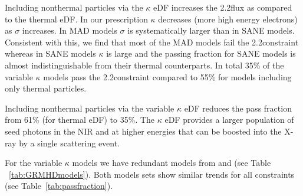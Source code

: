 Including nonthermal particles via the $\kappa$ eDF increases the 2.2\um flux as compared to the thermal eDF.  In our prescription $\kappa$ decreases (more high energy electrons) as $\sigma$ increases.  In MAD models $\sigma$ is systematically larger than in SANE models.  Consistent with this, we find that most of the MAD models fail the 2.2\um constraint whereas in SANE models $\kappa$ is large and the passing fraction for SANE models is almost indistinguishable from their thermal counterparts.
In total 35\% of the variable $\kappa$ models pass the 2.2\um constraint compared to 55\% for models including only thermal particles.


Including nonthermal particles via the variable $\kappa$ eDF reduces the pass fraction from 61\% (for thermal eDF) to 35\%.  The $\kappa$ eDF provides a larger population of seed photons in the NIR and at higher energies that can be boosted into the X-ray by a single scattering event.


For the variable $\kappa$ models we have redundant models from \bhac and \hamr (see Table ~\ref{tab:GRMHDmodels}).
Both models sets show similar trends for all constraints (see Table~\ref{tab:passfraction}).

